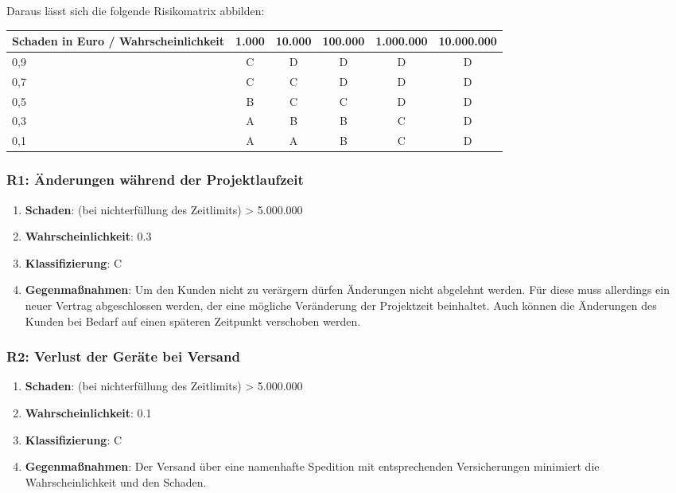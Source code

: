 Daraus lässt sich die folgende Risikomatrix abbilden:
\begin{table}[H]
	\renewcommand{\arraystretch}{1.2}
	\begin{center}
		\begin{tabular}{p{4cm}|c|c|c|c|c}
			
			Schaden in Euro / Wahrscheinlichkeit & 1.000 & 10.000 & 100.000 & 1.000.000 & 10.000.000\\\hline
			0,9 & C & D & D & D & D\\\hline
			0,7 & C & C & D & D & D\\\hline
			0,5 & B & C & C & D & D\\\hline
			0,3 & A & B & B & C &  D\\\hline
			0,1 & A & A & B &  C& D \\\hline
		\end{tabular}
	\end{center}
\end{table}


\subsubsection{R1: Änderungen während der Projektlaufzeit}
\begin{enumerate}
\item \textbf{Schaden}: (bei nichterfüllung des Zeitlimits) > 5.000.000
\item \textbf{Wahrscheinlichkeit}: 0.3
\item \textbf{Klassifizierung}: C
\item \textbf{Gegenmaßnahmen}: Um den Kunden nicht zu verärgern dürfen Änderungen nicht abgelehnt werden. Für diese muss allerdings ein neuer Vertrag abgeschlossen werden, der eine mögliche Veränderung der Projektzeit beinhaltet. Auch können die Änderungen des Kunden bei Bedarf auf einen späteren Zeitpunkt verschoben werden.
\end{enumerate}

\subsubsection{R2: Verlust der Geräte bei Versand}
\begin{enumerate}
	\item \textbf{Schaden}: (bei nichterfüllung des Zeitlimits) > 5.000.000
	\item \textbf{Wahrscheinlichkeit}: 0.1
	\item \textbf{Klassifizierung}: C
	\item \textbf{Gegenmaßnahmen}: Der Versand über eine namenhafte Spedition mit entsprechenden Versicherungen minimiert die Wahrscheinlichkeit und den Schaden.
\end{enumerate}
